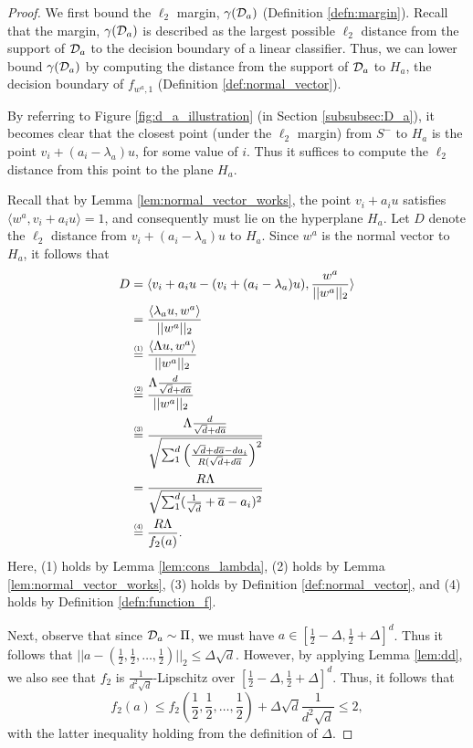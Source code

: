 \begin{proof}
We first bound the $\ell_2$ margin, $\gamma({\mathcal D}_a)$ (Definition \ref{defn:margin}). Recall that the margin, $\gamma({\mathcal D}_a)$ is described as the largest possible $\ell_2$ distance from the support of ${\mathcal D}_a$ to the decision boundary of a linear classifier. Thus, we can lower bound $\gamma({\mathcal D}_a)$ by computing the distance from the support of ${\mathcal D}_a$ to $H_a$, the decision boundary of $f_{w^a, 1}$ (Definition \ref{def:normal_vector}).

By referring to Figure \ref{fig:d_a_illustration} (in Section \ref{subsubsec:D_a}), it becomes clear that the closest point (under the $\ell_2$ margin) from $S^-$ to $H_a$ is the point $v_i + (a_i - \lambda_a)u$, for some value of $i$. Thus it suffices to compute the $\ell_2$ distance from this point to the plane $H_a$. 

Recall that by Lemma \ref{lem:normal_vector_works}, the point $v_i + a_iu$ satisfies $\langle w^a, v_i + a_iu \rangle = 1$, and consequently must lie on the hyperplane $H_a$. Let $D$ denote the $\ell_2$ distance from $v_i + (a_i - \lambda_a)u$ to $H_a$. Since $w^a$ is the normal vector to $H_a$, it follows that
\begin{equation*}
\begin{split}
D &= \langle v_i + a_iu - (v_i + (a_i - \lambda_a)u), \frac{w^a}{||w^a||_2} \rangle \\
&= \frac{\langle \lambda_a u, w^a \rangle}{||w^a||_2} \\
&\stackrel{\scriptscriptstyle(\mkern-1.5mu1\mkern-1.5mu)}{=} \frac{\langle \Lambda u, w^a \rangle}{||w^a||_2} \\
&\stackrel{\scriptscriptstyle(\mkern-1.5mu2\mkern-1.5mu)}{=} \frac{\Lambda \frac{d}{\sqrt{d} + d\overline{a}}}{||w^a||_2}  \\
&\stackrel{\scriptscriptstyle(\mkern-1.5mu3\mkern-1.5mu)}{=} \frac{\Lambda \frac{d}{\sqrt{d} + d\overline{a}}}{\sqrt{\sum_1^d \left(\frac{\sqrt{d} + d\overline{a} - da_i}{R(\sqrt{d} + d\overline{a}}\right)^2}} \\
&= \frac{R\Lambda}{\sqrt{\sum_1^d (\frac{1}{\sqrt{d}} + \overline{a} - a_i)^2}} \\
&\stackrel{\scriptscriptstyle(\mkern-1.5mu4\mkern-1.5mu)}{=} \frac{R\Lambda}{f_2(a)}.
\end{split}
\end{equation*}
Here, (1) holds by Lemma \ref{lem:cons_lambda}, (2) holds by Lemma \ref{lem:normal_vector_works}, (3) holds by Definition \ref{def:normal_vector}, and (4) holds by Definition \ref{defn:function_f}.

Next, observe that since ${\mathcal D}_a \sim \Pi$, we must have $a \in [\frac{1}{2} - \Delta, \frac{1}{2} + \Delta]^d$. Thus it follows that $||a - (\frac{1}{2}, \frac{1}{2}, \dots, \frac{1}{2})||_2 \leq \Delta\sqrt{d}$. However, by applying Lemma \ref{lem:dd}, we also see that $f_2$ is $\frac{1}{d^2\sqrt{d}}$-Lipschitz over $[\frac{1}{2} - \Delta, \frac{1}{2} + \Delta]^d$. Thus, it follows that $$f_2(a) \leq f_2(\frac{1}{2}, \frac{1}{2}, \dots, \frac{1}{2}) + \Delta\sqrt{d} \frac{1}{d^2\sqrt{d}} \leq 2,$$ with the latter inequality holding from the definition of $\Delta$. 


\end{proof}

